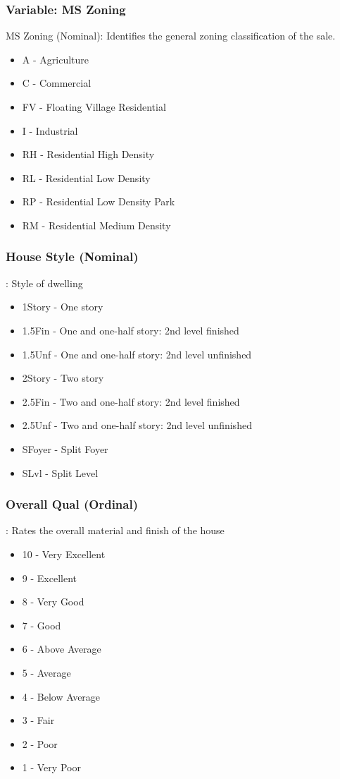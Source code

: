 \documentclass[sigconf]{acmart}
\begin{document}
	\subsubsection{Variable: MS Zoning}
	MS Zoning (Nominal): Identifies the general zoning classification of the sale.
	\begin{itemize}
		\item A - Agriculture
		\item C - Commercial
		\item FV - Floating Village Residential
		\item I - Industrial
		\item RH - Residential High Density
		\item RL - Residential Low Density
		\item RP - Residential Low Density Park
		\item RM - Residential Medium Density
	\end{itemize}

	\subsubsection{House Style (Nominal)}: Style of dwelling
	\begin{itemize}
		\item  1Story - One story
		\item  1.5Fin - One and one-half story: 2nd level finished
		\item  1.5Unf - One and one-half story: 2nd level unfinished
		\item  2Story - Two story
		\item  2.5Fin - Two and one-half story: 2nd level finished
		\item  2.5Unf - Two and one-half story: 2nd level unfinished
		\item  SFoyer - Split Foyer
		\item  SLvl - Split Level
	\end{itemize}

	\subsubsection{Overall Qual (Ordinal)}: Rates the overall material and finish of the house
	\begin{itemize}
		\item  10 - Very Excellent
		\item  9 -  Excellent
		\item  8 -  Very Good
		\item  7 -  Good
		\item  6 -  Above Average
		\item  5 -  Average
		\item  4 -  Below Average
		\item  3 -  Fair
		\item  2 -  Poor
		\item  1 -  Very Poor
	\end{itemize}
\end{document}
